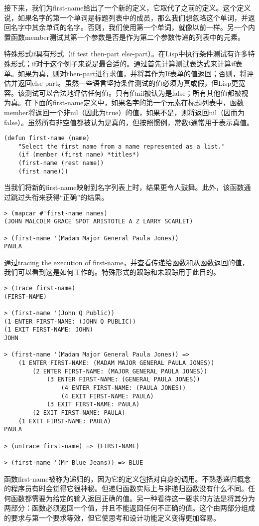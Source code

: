 接下来，我们为first-name给出了一个新的定义，它取代了之前的定义。这个定义说，如果名字的第一个单词是标题列表中的成员，那么我们想忽略这个单词，并返回名字中其余单词的名字。否则，我们使用第一个单词，就像以前一样。另一个内置函数member测试其第一个参数是否是作为第二个参数传递的列表中的元素。

特殊形式if具有形式（if test then-part else-part）。在Lisp中执行条件测试有许多特殊形式；if对于这个例子来说是最合适的。通过首先计算测试表达式来计算if表单。如果为真，则对then-part进行求值，并将其作为If表单的值返回；否则，将评估并返回else-part。虽然一些语言坚持条件测试的值必须为真或假，但Lisp更宽容。该测试可以合法地评估任何值。只有值nil被认为是false；所有其他值都被视为真。在下面的first-name定义中，如果名字的第一个元素在标题列表中，函数member将返回一个非nil（因此为true）的值，如果不是，则将返回nil（因而为false）。虽然所有非空值都被认为是真的，但按照惯例，常数t通常用于表示真值。
\begin{lstlisting}[frame=shadowbox]
(defun first-name (name)
	"Select the first name from a name represented as a list."
	(if (member (first name) *titles*)
	(first-name (rest name))
	(first name)))
\end{lstlisting}

当我们将新的first-name映射到名字列表上时，结果更令人鼓舞。此外，该函数通过跳过头衔来获得“正确”的结果。
\begin{lstlisting}[frame=shadowbox]
> (mapcar #'first-name names)
(JOHN MALCOLM GRACE SPOT ARISTOTLE A Z LARRY SCARLET)

> (first-name '(Madam Major General Paula Jones))
PAULA
\end{lstlisting}

通过tracing the execution of first-name，并查看传递给函数和从函数返回的值，我们可以看到这是如何工作的。特殊形式的跟踪和未跟踪用于此目的。
\begin{lstlisting}[frame=shadowbox]
> (trace first-name)
(FIRST-NAME)

> (first-name '(John Q Public))
(1 ENTER FIRST-NAME: (JOHN Q PUBLIC))
(1 EXIT FIRST-NAME: JOHN)
JOHN

> (first-name '(Madam Major General Paula Jones)) =>
	(1 ENTER FIRST-NAME: (MADAM MAJOR GENERAL PAULA JONES))
		(2 ENTER FIRST-NAME: (MAJOR GENERAL PAULA JONES))
			(3 ENTER FIRST-NAME: (GENERAL PAULA JONES))
				(4 ENTER FIRST-NAME: (PAULA JONES))
				(4 EXIT FIRST-NAME: PAULA)
			(3 EXIT FIRST-NAME: PAULA)
		(2 EXIT FIRST-NAME: PAULA)
	(1 EXIT FIRST-NAME: PAULA)
PAULA

> (untrace first-name) => (FIRST-NAME)

> (first-name '(Mr Blue Jeans)) => BLUE
\end{lstlisting}
函数first-name被称为递归的，因为它的定义包括对自身的调用。不熟悉递归概念的程序员有时会觉得它很神秘。但递归函数实际上与非递归函数没有什么不同。任何函数都需要为给定的输入返回正确的值。另一种看待这一要求的方法是将其分为两部分：函数必须返回一个值，并且不能返回任何不正确的值。这个由两部分组成的要求与第一个要求等效，但它使思考和设计功能定义变得更加容易。

